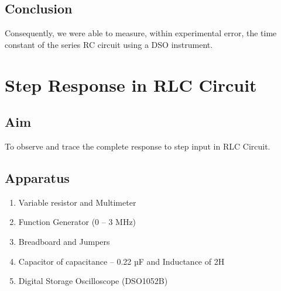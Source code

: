 \documentclass{article}
\begin{document}
\subsection{Conclusion}
Consequently, we were able to measure, within experimental error, the time constant of the series RC circuit using a DSO instrument.
\newpage
\section{Step Response in RLC Circuit}
\subsection{Aim}
To observe and trace the complete response to step input in RLC Circuit.
 \subsection{Apparatus}
 \begin{enumerate}
    \item Variable resistor and Multimeter
    \item Function Generator (0 – 3 MHz)
    \item Breadboard and Jumpers
    \item Capacitor of capacitance – 0.22 µF and Inductance of 2H
    \item Digital Storage Oscilloscope (DSO1052B)
\end{enumerate}
\end{document}
